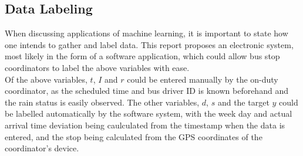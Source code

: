 \documentclass[11pt]{extarticle}
\begin{document}
\subsection{Data Labeling}
When discussing applications of machine learning, it is important to state how one intends to gather and label data. This report proposes an electronic system, most likely in the form of a software application, which could allow bus stop coordinators to label the above variables with ease.
\\
Of the above variables, $t$, $I$ and $r$ could be entered manually by the on-duty coordinator, as the scheduled time and bus driver ID is known beforehand and the rain status is easily observed. The other variables, $d$, $s$ and the target $y$ could be labelled automatically by the software system, with the week day and actual arrival time deviation being caulculated from the timestamp when the data is entered, and the stop being calculated from the GPS coordinates of the coordinator's device.

 
\end{document}
